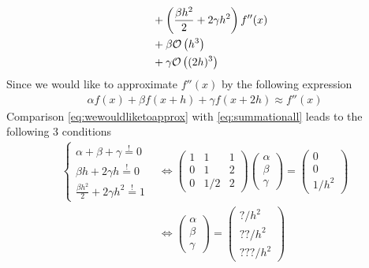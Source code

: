 \documentclass[12pt]{article}
\begin{document}
\begin{enumerate}
\begin{align}
		       & \quad + \left( \frac{\beta h^2}{2} + 2\gamma h^2 \right)f''(x) \notag \\
		       & \quad + \beta \mathcal{O}\left( h^3 \right)                    \notag \\
		       & \quad + \gamma \mathcal{O}\left( (2h)^3 \right)
	      \end{align}
	      Since we would like to approximate $f''(x)$ by the following expression
	      \begin{align}
		      \label{eq:wewouldliketoapprox}
		      \alpha f(x) + \beta f(x+h) + \gamma f(x+2h) \approx f''(x)
	      \end{align}
	      Comparison \eqref{eq:wewouldliketoapprox} with \eqref{eq:summationall} leads to the following 3 conditions
	      \begin{align}
		      \label{eq:alphabetagamma}
		      \begin{cases}
			      \alpha + \beta + \gamma \stackrel{!}{=} 0 \\
			      \beta h + 2 \gamma h \stackrel{!}{=}  0   \\
			      \displaystyle \frac{\beta h^2}{2} + 2\gamma h^2 \stackrel{!}{=} 1
		      \end{cases}
		       & \Leftrightarrow
		      \begin{pmatrix}
			      1 & 1   & 1 \\
			      0 & 1   & 2 \\
			      0 & 1/2 & 2
		      \end{pmatrix}
		      \begin{pmatrix}
			      \alpha \\ \beta \\ \gamma
		      \end{pmatrix}
		      =
		      \begin{pmatrix}
			      0 \\ 0 \\ 1/h^2
		      \end{pmatrix} \\
		       & \Leftrightarrow
		      \begin{pmatrix}
			      \alpha \\ \beta \\ \gamma
		      \end{pmatrix}
		      =
		      \begin{pmatrix}
			      ?/h^2 \\ ??/h^2 \\ ???/h^2

\end{pmatrix}
\end{align}
\end{enumerate}
\end{document}
